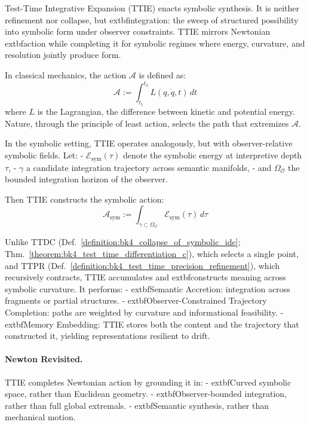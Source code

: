 \begin{scholium}
\label{scholium:bk4_tt_integrative_expansion_action}
Test-Time Integrative Expansion (TTIE) enacts symbolic synthesis. It is neither
refinement nor collapse, but 	extbf{integration}: the sweep of structured
possibility into symbolic form under observer constraints. TTIE mirrors
Newtonian 	extbf{action} while completing it for symbolic regimes where energy,
curvature, and resolution jointly produce form.

In classical mechanics, the action $\mathcal{A}$ is defined as:
\[
\mathcal{A} := \int_{t_1}^{t_2} L(q, \dot{q}, t)\,dt
\]
where $L$ is the Lagrangian, the difference between kinetic and potential energy. Nature, through the principle of least action, selects the path that extremizes $\mathcal{A}$.

In the symbolic setting, TTIE operates analogously, but with observer-relative symbolic fields. Let:
- $\mathcal{E}_{\text{sym}}(\tau)$ denote the symbolic energy at interpretive depth $\tau$,
- $\gamma$ a candidate integration trajectory across semantic manifolds,
- and $\Omega_{\mathcal{O}}$ the bounded integration horizon of the observer.

Then TTIE constructs the symbolic action:
\[
\mathcal{A}_{\text{sym}} := \int_{\gamma \subset \Omega_{\mathcal{O}}} \mathcal{E}_{\text{sym}}(\tau)\,d\tau
\]

Unlike TTDC (Def.~\ref{definition:bk4_collapse_of_symbolic_ide}; Thm.~\ref{theorem:bk4_test_time_differentiation_c}), which selects a single point, and TTPR (Def.~\ref{definition:bk4_test_time_precision_refinement}), which recursively contracts, TTIE accumulates and 	extbf{constructs meaning} across symbolic curvature. It performs:
- 	extbf{Semantic Accretion}: integration across fragments or partial structures.
- 	extbf{Observer-Constrained Trajectory Completion}: paths are weighted by curvature and informational feasibility.
- 	extbf{Memory Embedding}: TTIE stores both the content and the trajectory that constructed it, yielding representations resilient to drift.

\paragraph{Newton Revisited.} TTIE completes Newtonian action by grounding it in:
- 	extbf{Curved symbolic space}, rather than Euclidean geometry.
- 	extbf{Observer-bounded integration}, rather than full global extremals.
- 	extbf{Semantic synthesis}, rather than mechanical motion.


\end{scholium}
